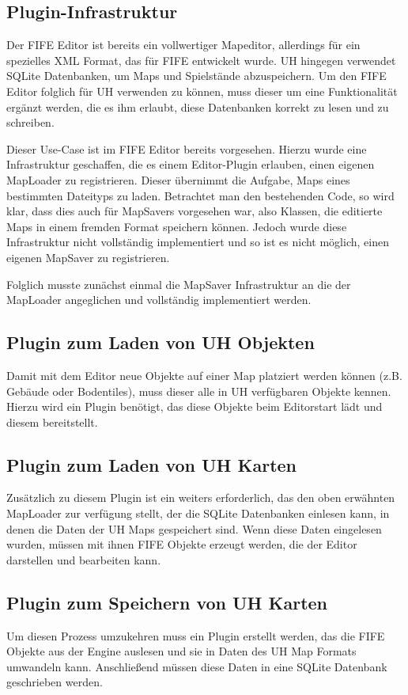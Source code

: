 \subsection{Plugin-Infrastruktur}
Der FIFE Editor ist bereits ein vollwertiger Mapeditor, allerdings für ein spezielles XML Format,
das für FIFE entwickelt wurde. UH hingegen verwendet SQLite Datenbanken, um Maps und Spielstände
abzuspeichern. Um den FIFE Editor folglich für UH verwenden zu können, muss dieser um eine
Funktionalität ergänzt werden, die es ihm erlaubt, diese Datenbanken korrekt zu lesen und zu schreiben.

Dieser Use-Case ist im FIFE Editor bereits vorgesehen. Hierzu wurde eine Infrastruktur geschaffen, die
es einem Editor-Plugin erlauben, einen eigenen MapLoader zu registrieren. Dieser übernimmt die
Aufgabe, Maps eines bestimmten Dateityps zu laden. Betrachtet man den bestehenden Code, so wird klar,
dass dies auch für MapSavers vorgesehen war, also Klassen, die editierte Maps in einem fremden Format
speichern können. Jedoch wurde diese Infrastruktur nicht vollständig implementiert und so ist es
nicht möglich, einen eigenen MapSaver zu registrieren.

Folglich musste zunächst einmal die MapSaver Infrastruktur an die der MapLoader angeglichen und vollständig
implementiert werden.

\subsection{Plugin zum Laden von UH Objekten}
Damit mit dem Editor neue Objekte auf einer Map platziert werden können (z.B. Gebäude oder Bodentiles),
muss dieser alle in UH verfügbaren Objekte kennen. Hierzu wird ein Plugin benötigt, das diese
Objekte beim Editorstart lädt und diesem bereitstellt.

\subsection{Plugin zum Laden von UH Karten}
Zusätzlich zu diesem Plugin ist ein weiters erforderlich, das den oben erwähnten MapLoader
zur verfügung stellt, der die SQLite Datenbanken einlesen kann, in denen die Daten der
UH Maps gespeichert sind. Wenn diese Daten eingelesen wurden, müssen mit ihnen FIFE Objekte
erzeugt werden, die der Editor darstellen und bearbeiten kann.

\subsection{Plugin zum Speichern von UH Karten}
Um diesen Prozess umzukehren muss ein Plugin erstellt werden, das die FIFE Objekte aus der
Engine auslesen und sie in Daten des UH Map Formats umwandeln kann. Anschließend müssen diese
Daten in eine SQLite Datenbank geschrieben werden.

